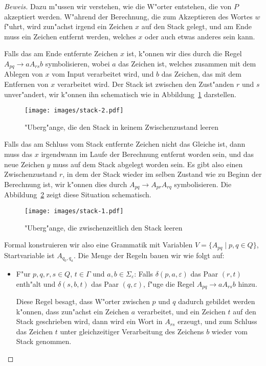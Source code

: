 \begin{proof}[Beweis]
Dazu m"ussen wir verstehen, wie die W"orter entstehen, die von $P$
akzeptiert werden. W"ahrend der Berechnung, die zum Akzeptieren des
Wortes $w$ f"uhrt, wird zun"achst
irgend ein Zeichen $x$ auf den Stack gelegt, und am Ende muss ein
Zeichen entfernt werden, welches $x$ oder auch etwas anderes sein kann.

Falls das am Ende entfernte Zeichen $x$ ist, k"onnen wir dies durch
die Regel $A_{pq}\to aA_{rs}b$ symbolisieren, wobei $a$ das Zeichen
ist, welches zusammen mit dem Ablegen von $x$ vom Input verarbeitet wird,
und $b$ das Zeichen, das mit dem Entfernen von $x$ verarbeitet wird.
Der Stack ist zwischen den Zust"anden $r$ und $s$ unver"andert, wir
k"onnen ihn schematisch wie in Abbildung~\ref{stacknichtleer} darstellen.
\begin{figure}
\begin{center}
\texttt{[image: images/stack-2.pdf]}
\end{center}
\caption{"Uberg"ange, die den Stack in keinem Zwischenzustand leeren\label{stacknichtleer}}
\end{figure}

Falls das am Schluss vom Stack entfernte Zeichen nicht das Gleiche ist,
dann muss das $x$ irgendwann im Laufe der Berechnung entfernt worden
sein, und das neue Zeichen $y$ muss auf dem Stack abgelegt worden
sein. Es gibt also einen Zwischenzustand $r$, in dem der Stack
wieder im selben Zustand wie zu
Beginn der Berechnung ist, wir k"onnen dies durch
$A_{pq}\to A_{pr}A_{rq}$ symbolisieren.
Die Abbildung~\ref{stackleer} zeigt diese Situation schematisch.
\begin{figure}
\begin{center}
\texttt{[image: images/stack-1.pdf]}
\end{center}
\caption{"Uberg"ange, die zwischenzeitlich den Stack leeren\label{stackleer}}
\end{figure}

Formal konstruieren wir also eine Grammatik mit Variablen
$V=\{A_{pq}\;|\; p,q\in Q\}$, Startvariable ist $A_{q_0,q_a}$.
Die Menge der Regeln bauen wir wie folgt auf:
\begin{itemize}
\item F"ur $p,q,r,s\in Q$, $t\in\Gamma$ und $a,b\in\Sigma_{\varepsilon}$:
Falls $\delta(p,a,\varepsilon)$ das Paar $(r,t)$ enth"alt
und $\delta(s,b,t)$ das Paar $(q,\varepsilon)$, f"uge die Regel
$A_{pq}\to aA_{rs}b$ hinzu.

Diese Regel besagt, dass W"orter zwischen $p$ und $q$ dadurch gebildet
werden k"onnen, dass zun"achst ein Zeichen $a$ verarbeitet, und
ein Zeichen $t$ auf den Stack geschrieben wird, dann wird ein Wort
in $A_{rs}$ erzeugt, und zum Schluss das Zeichen $t$ unter
gleichzeitiger Verarbeitung des Zeichens $b$ wieder vom Stack
genommen.


\end{itemize}
\end{proof}
